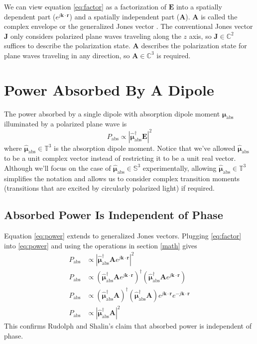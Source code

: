 \documentclass[11pt]{article}
\providecommand{\mb}[1]{\mathbf{#1}}
\providecommand{\bs}[1]{\boldsymbol{#1}}
\begin{document}
We can view equation \ref{eq:factor} as a factorization of $\mb{E}$ into a
spatially dependent part ($e^{j\mb{k}\cdot\mb{r}}$) and a spatially independent
part ($\mb{A}$). $\mb{A}$ is called the complex envelope \cite{saleh} or the
generalized Jones vector \cite{azzam}. The conventional Jones vector $\mb{J}$
only considers polarized plane waves traveling along the $z$ axis, so
$\mb{J}\in\mathbb{C}^2$ suffices to describe the polarization state. $\mb{A}$
describes the polarization state for plane waves traveling in any direction, so
$\mb{A} \in \mathbb{C}^3$ is required.

\section{Power Absorbed By A Dipole}
The power absorbed by a single dipole with absorption dipole moment
$\bs{\mu}_{\text{abs}}$ illuminated by a polarized plane wave is \cite{nov}
\begin{equation}
  P_{\text{abs}} \propto |\hat{\bs{\mu}}_{\text{abs}}^{\dagger} \mb{E}|^2
  \label{eq:power}
\end{equation}
where $\hat{\bs{\mu}}_{\text{abs}} \in \mathbb{T}^3$ is the absorption dipole
moment. Notice that we've allowed $\hat{\bs{\mu}}_{\text{abs}}$ to be a unit
complex vector instead of restricting it to be a unit real vector. Although
we'll focus on the case of $\hat{\bs{\mu}}_{\text{abs}} \in \mathbb{S}^3$
experimentally, allowing $\hat{\bs{\mu}}_{\text{abs}} \in \mathbb{T}^3$
simplifies the notation and allows us to consider complex transition moments
(transitions that are excited by circularly polarized light) if required. 

\subsection{Absorbed Power Is Independent of Phase}
Equation \ref{eq:power} extends to generalized Jones vectors. Plugging
\ref{eq:factor} into \ref{eq:power} and using the operations in section \ref{math} gives
\begin{align}
  P_{\text{abs}} &\propto |\hat{\bs{\mu}}_{\text{abs}}^{\dagger} \mb{A}e^{j\mb{k}\cdot\mb{r}}|^2\\
  P_{\text{abs}} &\propto (\hat{\bs{\mu}}_{\text{abs}}^{\dagger} \mb{A}e^{j\mb{k}\cdot\mb{r}})^{\dagger}(\hat{\bs{\mu}}_{\text{abs}}^{\dagger} \mb{A}e^{j\mb{k}\cdot\mb{r}})\\
  P_{\text{abs}} &\propto (\hat{\bs{\mu}}_{\text{abs}}^{\dagger} \mb{A})^{\dagger}(\hat{\bs{\mu}}_{\text{abs}}^{\dagger} \mb{A})e^{j\mb{k}\cdot\mb{r}}e^{-j\mb{k}\cdot\mb{r}}\\
  P_{\text{abs}} &\propto |\hat{\bs{\mu}}_{\text{abs}}^{\dagger} \mb{A}|^2
  \label{eq:power2}                   
\end{align}
This confirms Rudolph and Shalin's claim that absorbed power is independent of
phase. 
\end{document}
